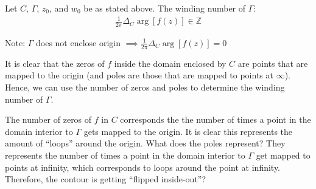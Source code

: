 \documentclass[12pt, english]{book}
\begin{document}
	\begin{definition}
		\label{Winding Number Definition - Complex}
		Let \(C\), \(\Gamma\), \(z_0\), and \(w_0\) be as stated above. The winding number of \(\Gamma\):
		\begin{align*}
			\frac{1}{2\pi} \Delta_C \arg[f(z)] \in \mathbb{Z}
		\end{align*}
	\end{definition}
	Note: \(\Gamma\) does not enclose origin \(\implies \frac{1}{2\pi} \Delta_C \arg[f(z)] = 0\)
	
	It is clear that the zeros of \(f\) inside the domain enclosed by \(C\) are points that are mapped to the origin (and poles are those that are mapped to points at \(\infty\)). Hence, we can use the number of zeros and poles to determine the winding number of \(\Gamma\).
	
	\begin{question}
		The number of zeros of \(f\) in \(C\) corresponds the the number of times a point in the domain interior to \(\Gamma\) gets mapped to the origin. It is clear this represents the amount of ``loops'' around the origin. What does the poles represent? They represents the number of times a point in the domain interior to \(\Gamma\) get mapped to points at infinity, which corresponds to loops around the point at infinity. Therefore, the contour is getting ``flipped inside-out''?
	\end{question}
	
\end{document}
